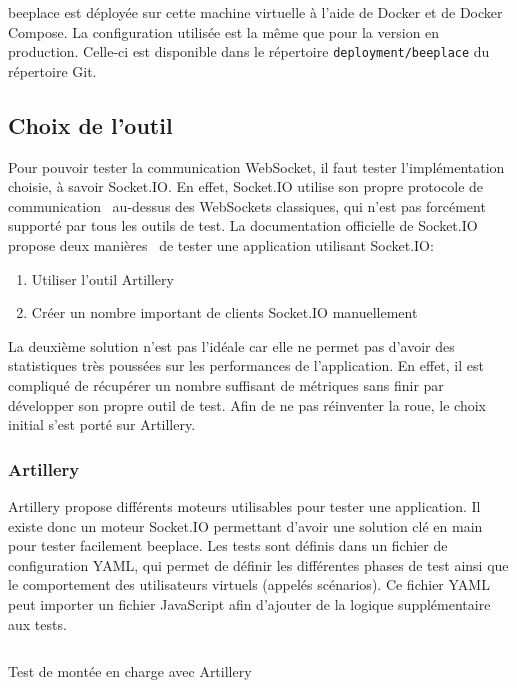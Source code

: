 \gls{beeplace} est déployée sur cette machine virtuelle à l'aide de Docker et de Docker Compose. La configuration utilisée est la même que pour la version en production. Celle-ci est disponible dans le répertoire \texttt{deployment/beeplace} du répertoire Git.

\subsection{Choix de l'outil}

Pour pouvoir tester la communication WebSocket, il faut tester l'implémentation choisie, à savoir Socket.IO. En effet, Socket.IO utilise son propre protocole de communication~\cite{socket-io-protocol} au-dessus des WebSockets classiques, qui n'est pas forcément supporté par tous les outils de test. La documentation officielle de Socket.IO propose deux manières~\cite{socket-io-load-testing} de tester une application utilisant Socket.IO:

\begin{enumerate}
  \item Utiliser l'outil Artillery~\cite{artillery}
  \item Créer un nombre important de clients Socket.IO manuellement
\end{enumerate}

La deuxième solution n'est pas l'idéale car elle ne permet pas d'avoir des statistiques très poussées sur les performances de l'application. En effet, il est compliqué de récupérer un nombre suffisant de métriques sans finir par développer son propre outil de test. Afin de ne pas réinventer la roue, le choix initial s'est porté sur Artillery.

\subsubsection{Artillery}

Artillery propose différents moteurs utilisables pour tester une application. Il existe donc un moteur Socket.IO permettant d'avoir une solution clé en main pour tester facilement \gls{beeplace}. Les tests sont définis dans un fichier de configuration YAML, qui permet de définir les différentes phases de test ainsi que le comportement des utilisateurs virtuels (appelés scénarios). Ce fichier YAML peut importer un fichier JavaScript afin d'ajouter de la logique supplémentaire aux tests.

\begin{listing}[h]
  \inputminted[linenos]{yaml}{assets/figures/artillery-test.yml}
  \caption{Test de montée en charge avec Artillery}
  \label{listing:artillery}
\end{listing}

